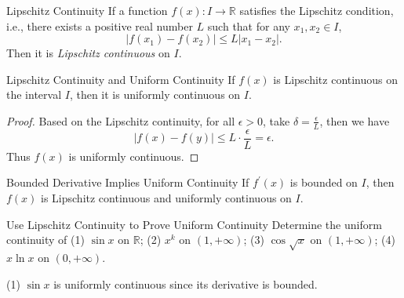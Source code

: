 \begin{definition}{Lipschitz Continuity}{}
  If a function $f(x): I \rightarrow \mathbb{R}$
  satisfies the Lipschitz condition, i.e.,
  there exists a positive real number $L$ such that
  for any $x_1, x_2 \in I$,
  \begin{equation}
    |f(x_1) - f(x_2)| \leq L |x_1 - x_2|.
  \end{equation}
  Then it is \emph{Lipschitz continuous} on $I$.
\end{definition}

\begin{proposition}{Lipschitz Continuity and Uniform Continuity}{}
  If $f(x)$ is Lipschitz continuous on the interval $I$,
  then it is uniformly continuous on $I$.
\end{proposition}

\begin{proof}
  Based on the Lipschitz continuity, for all $\epsilon > 0$,
  take $\delta = \frac{\epsilon}{L}$, then we have
  \begin{equation}
    |f(x) - f(y)| \leq L \cdot \frac{\epsilon}{L} = \epsilon.
  \end{equation}
  Thus $f(x)$ is uniformly continuous.
\end{proof}

\begin{corollary}{Bounded Derivative Implies Uniform Continuity}{}
  If $f^{\prime}(x)$ is bounded on $I$, then $f(x)$ is Lipschitz continuous and
  uniformly continuous on $I$.
\end{corollary}

\begin{example}{Use Lipschitz Continuity to Prove Uniform Continuity}{}
  Determine the uniform continuity of
  (1) $\sin x$ on $\mathbb{R}$;
  (2) $x^k$ on $(1, +\infty)$;
  (3) $\cos \sqrt{x}$ on $(1, +\infty)$;
  (4) $x \ln x$ on $(0, +\infty)$.
\end{example}

\begin{solution}
  (1) $\sin x$ is uniformly continuous since its derivative is bounded.
\end{solution}

